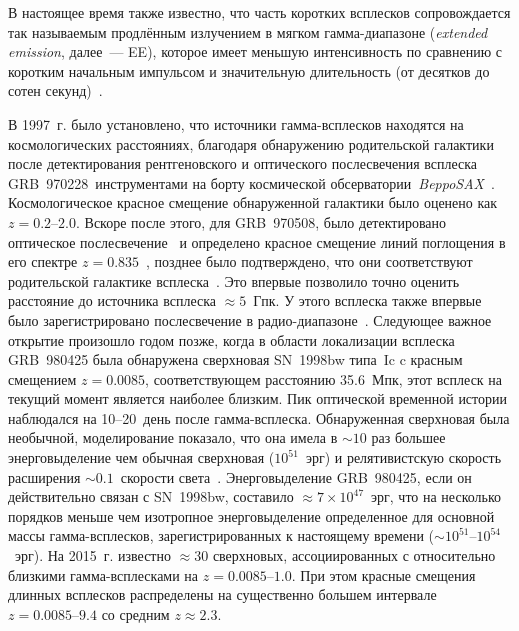 В настоящее время также известно, что часть коротких всплесков
сопровождается так называемым продлённым излучением в мягком гамма-диапазоне 
(\textit{extended emission}, далее~--- EE), которое имеет меньшую интенсивность 
по сравнению с коротким начальным импульсом и значительную длительность 
(от десятков до сотен секунд)~\citep[см., к примеру,][]{Burenin_2000AstL,Mazets_2002astro_ph,Frederiks_2004ASPC,Norris_and_Bonnel_2006ApJ}.

В 1997~г. было установлено, что источники гамма-всплесков находятся на космологических расстояниях, 
благодаря обнаружению родительской галактики после детектирования 
рентгеновского и оптического послесвечения всплеска GRB~970228\footnotemark\ инструментами на 
борту космической обсерватории~\textit{BeppoSAX}~\citep{Costa1997Natur, van_Paradijs_1997Natur}.
Космологическое красное смещение обнаруженной галактики было оценено как $z=0.2\mbox{--}2.0$.
Вскоре после этого, для GRB~970508, было детектировано оптическое послесвечение~\citep{Djorgovski_1997Natur} 
и определено красное смещение линий поглощения в его спектре 
$z=0.835$~\citep{Metzger_1997Natur, Reichart_1998ApJ}, позднее было подтверждено, 
что они соответствуют родительской галактике всплеска~\citep{Fruchter_2000ApJ}. 
Это впервые позволило точно оценить расстояние до источника всплеска $\approx 5$~Гпк. 
У этого всплеска также впервые было зарегистрировано послесвечение в радио-диапазоне~\citep{Frail_1997Natur}.
Следующее важное открытие произошло годом позже, когда в области локализации 
всплеска GRB~980425 была обнаружена сверхновая SN~1998bw типа~Ic c красным смещением $z=0.0085$,
соответствующем расстоянию 35.6~Мпк, этот всплеск на текущий момент является наиболее близким.
Пик оптической временной истории наблюдался на 10--20~день после гамма-всплеска.
Обнаруженная сверхновая была необычной, моделирование показало, что она 
имела в $\sim 10$ раз большее энерговыделение чем обычная 
сверхновая ($10^{51}$~эрг) и релятивистскую скорость расширения 
$\sim 0.1$~скорости света~\citep{Hjorth_and_Bloom_2012in_book}. 
Энерговыделение GRB~980425, если он действительно связан с SN~1998bw, составило 
$\approx 7\times 10^{47}$~эрг, что на несколько порядков меньше чем изотропное энерговыделение 
определенное для основной массы гамма-всплесков, зарегистрированных к настоящему 
времени ($\sim 10^{51}$--$10^{54}$~эрг).
На 2015~г. известно $\approx 30$ сверхновых, ассоциированных с относительно близкими 
гамма-всплесками на $z=0.0085\mbox{--}1.0$.
При этом красные смещения длинных всплесков распределены на существенно большем 
интервале $z=0.0085\mbox{--}9.4$ со средним $z\approx 2.3$.

